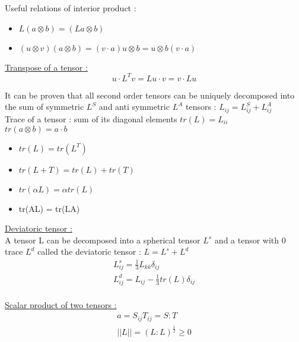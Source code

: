 \documentclass[../main.tex]{subfiles}
\begin{document}
Useful relations of interior product :
\begin{itemize}
    \item $L(a\otimes b) = (La \otimes b)$\\
    \item $(u\otimes v)(a\otimes b) = (v\cdot a)u\otimes b = u\otimes b(v\cdot a)$\\
\end{itemize}

\quad \underline{Transpose of a tensor :}\\
\begin{equation}
    u\cdot L^T v = Lu\cdot v = v\cdot Lu
\end{equation}

It can be proven that all second order tensors can be uniquely decomposed into the sum of symmetric $L^S$ and anti symmetric $L^A$ tensors : $L_{ij} = L_{ij}^S + L_{ij}^A$\\

Trace of a tensor : sum of its diagonal elements $tr(L) = L_{ii}$\\
$tr(a\otimes b) = a\cdot b$\\

\begin{itemize}
    \item $tr(L)= tr(L^T)$\\
    \item $tr(L+T) = tr(L) + tr(T)$\\
    \item $tr(\alpha L) = \alpha tr(L)$\\
    \item tr(AL) = tr(LA)\\
\end{itemize}

\quad \underline{Deviatoric tensor :}\\
A tensor L can be decomposed into a spherical tensor $L^s$ and a tensor with 0 trace $L^d$ called the deviatoric tensor : $L = L^s + L^d$\begin{equation}
    \begin{gathered}
        L_{ij}^s = \frac{1}{3}L_{kk} \delta_{ij}\\
        L_{ij}^d = L_{ij} - \frac{1}{3}tr(L) \delta_{ij}\\
    \end{gathered}
\end{equation}

\quad \underline{Scalar product of two tensors :}\\
\begin{equation}
\begin{gathered}
    a = S_{ij}T_{ij} = S:T\\
    \lvert \lvert L \rvert \rvert = (L:L)^{\frac{1}{2}} \geq 0\\
    \end{gathered}
\end{equation}
\end{document}
